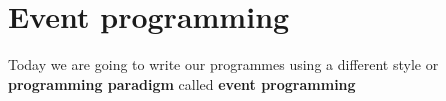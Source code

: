 \documentclass{coderdojo}
\begin{document}

\clearpage
\section{Event programming}

Today we are going to write our programmes using a different style or {\bfseries programming paradigm} called {\bfseries event programming}
\end{document}
